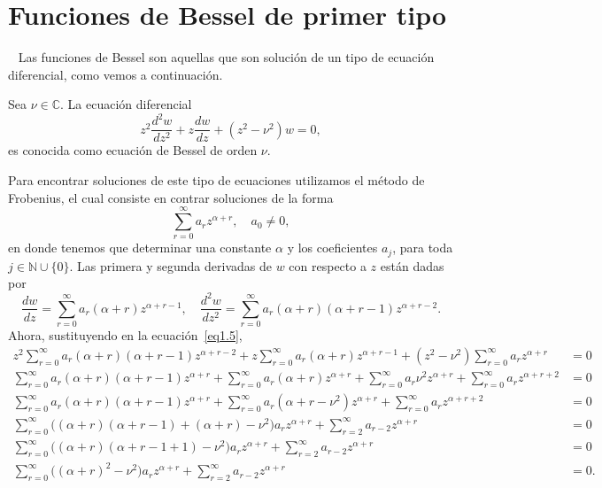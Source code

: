 \documentclass[main.tex]{subfiles}
\begin{document}
\section{Funciones de Bessel de primer tipo}
\noindent~\cite{epelde} Las funciones de Bessel son aquellas que son solución de un tipo de ecuación diferencial, como vemos a continuación.
\begin{def.}\label{d1.3} %
  Sea $\nu\in\mathbb{C}$. La ecuación diferencial
  \begin{equation}
    \label{eq1.5}
    z^{2}\frac{d^{2}w}{dz^{2}}+z\frac{dw}{dz}+(z^{2}-\nu^{2})w=0,
  \end{equation}
  es conocida como ecuación de Bessel de orden $\nu$.
\end{def.}
Para encontrar soluciones de este tipo de ecuaciones utilizamos el método de Frobenius, el cual consiste en contrar soluciones de la forma
\[
  \sum_{r=0}^{\infty}a_{r}z^{\alpha+r},\quad a_{0}\neq0,
\]
en donde tenemos que determinar una constante $\alpha$ y los coeficientes $a_{j}$, para toda $j\in\mathbb{N}\cup\{0\}$. Las primera y segunda derivadas de $w$ con respecto a $z$ están dadas por
\[
  \frac{dw}{dz}=\sum_{r=0}^{\infty}a_{r}(\alpha+r)z^{\alpha+r-1},\quad\frac{d^{2}w}{dz^{2}}=\sum_{r=0}^{\infty}a_{r}(\alpha+r)(\alpha+r-1)z^{\alpha+r-2}.
\]
Ahora, sustituyendo en la ecuación~\eqref{eq1.5},
\begin{align*}
  z^{2}\sum_{r=0}^{\infty}a_{r}(\alpha+r)(\alpha+r-1)z^{\alpha+r-2}+z\sum_{r=0}^{\infty}a_{r}(\alpha+r)z^{\alpha+r-1}+(z^{2}-\nu^{2})\sum_{r=0}^{\infty}a_{r}z^{\alpha+r}&=0\\
  \sum_{r=0}^{\infty}a_{r}(\alpha+r)(\alpha+r-1)z^{\alpha+r}+\sum_{r=0}^{\infty}a_{r}(\alpha+r)z^{\alpha+r}+\sum_{r=0}^{\infty}a_{r}\nu^{2}z^{\alpha+r}+\sum_{r=0}^{\infty}a_{r}z^{\alpha+r+2}&=0\\
  \sum_{r=0}^{\infty}a_{r}(\alpha+r)(\alpha+r-1)z^{\alpha+r}+\sum_{r=0}^{\infty}a_{r}(\alpha+r-\nu^{2})z^{\alpha+r}+\sum_{r=0}^{\infty}a_{r}z^{\alpha+r+2}&=0\\
  \sum_{r=0}^{\infty}\big((\alpha+r)(\alpha+r-1)+(\alpha+r)-\nu^{2}\big)a_{r}z^{\alpha+r}+\sum_{r=2}^{\infty}a_{r-2}z^{\alpha+r}&=0\\
  \sum_{r=0}^{\infty}\big((\alpha+r)(\alpha+r-1+1)-\nu^{2}\big)a_{r}z^{\alpha+r}+\sum_{r=2}^{\infty}a_{r-2}z^{\alpha+r}&=0\\
  \sum_{r=0}^{\infty}\big((\alpha+r)^{2}-\nu^{2}\big)a_{r}z^{\alpha+r}+\sum_{r=2}^{\infty}a_{r-2}z^{\alpha+r}&=0.
\end{align*}
\end{document}
